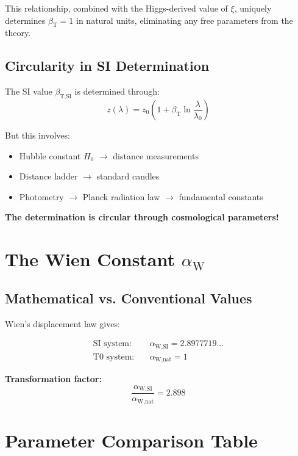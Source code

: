 \documentclass[12pt,a4paper]{article}
\newcommand{\xipar}{\xi}
\newcommand{\betaTSI}{\beta_{\text{T,SI}}}
\newcommand{\alphaWSI}{\alpha_{\text{W,SI}}}
\newcommand{\alphaWnat}{\alpha_{\text{W,nat}}}
\begin{document}
	This relationship, combined with the Higgs-derived value of $\xipar$, uniquely determines $\beta_{\text{T}} = 1$ in natural units, eliminating any free parameters from the theory.
	
	\subsection{Circularity in SI Determination}
	\label{subsec:beta_circularity}
	
	The SI value $\betaTSI$ is determined through:
	$$z(\lambda) = z_0\left(1 + \beta_{\text{T}} \ln\frac{\lambda}{\lambda_0}\right)$$
	
	But this involves:
	\begin{itemize}
		\item Hubble constant $H_0$ $\rightarrow$ distance measurements
		\item Distance ladder $\rightarrow$ standard candles
		\item Photometry $\rightarrow$ Planck radiation law $\rightarrow$ fundamental constants
	\end{itemize}
	
	\textbf{The determination is circular through cosmological parameters!}
	
	\section{The Wien Constant $\alpha_{\text{W}}$}
	\label{sec:alpha_w}
	
	\subsection{Mathematical vs. Conventional Values}
	\label{subsec:wien_values}
	
	Wien's displacement law gives:
	
	\begin{align}
		\text{SI system:} \quad &\alphaWSI = 2.8977719... \\
		\text{T0 system:} \quad &\alphaWnat = 1
	\end{align}
	
	\textbf{Transformation factor:}
	$$\frac{\alphaWSI}{\alphaWnat} = 2.898$$
	
	\section{Parameter Comparison Table}
	\label{sec:parameter_comparison}
	
\end{document}
